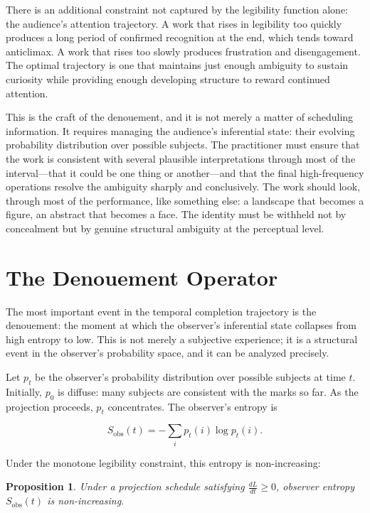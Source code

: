 \documentclass[11pt, twoside]{article}
\theoremstyle{plain}
\newtheorem{proposition}[theorem]{Proposition}
\theoremstyle{definition}
\theoremstyle{remark}
\begin{document}
There is an additional constraint not captured by the legibility function alone: the audience's attention trajectory. A work that rises in legibility too quickly produces a long period of confirmed recognition at the end, which tends toward anticlimax. A work that rises too slowly produces frustration and disengagement. The optimal trajectory is one that maintains just enough ambiguity to sustain curiosity while providing enough developing structure to reward continued attention.

This is the craft of the denouement, and it is not merely a matter of scheduling information. It requires managing the audience's inferential state: their evolving probability distribution over possible subjects. The practitioner must ensure that the work is consistent with several plausible interpretations through most of the interval---that it could be one thing or another---and that the final high-frequency operations resolve the ambiguity sharply and conclusively. The work should look, through most of the performance, like something else: a landscape that becomes a figure, an abstract that becomes a face. The identity must be withheld not by concealment but by genuine structural ambiguity at the perceptual level.

\section{The Denouement Operator}
\label{sec:denouement}

The most important event in the temporal completion trajectory is the denouement: the moment at which the observer's inferential state collapses from high entropy to low. This is not merely a subjective experience; it is a structural event in the observer's probability space, and it can be analyzed precisely.

Let $p_t$ be the observer's probability distribution over possible subjects at time $t$. Initially, $p_0$ is diffuse: many subjects are consistent with the marks so far. As the projection proceeds, $p_t$ concentrates. The observer's entropy is

\[
S_{\text{obs}}(t) = -\sum_i p_t(i) \log p_t(i).
\]

Under the monotone legibility constraint, this entropy is non-increasing:

\begin{proposition}
\label{prop:observer-entropy}
Under a projection schedule satisfying $\frac{dL}{dt} \geq 0$, observer entropy $S_{\text{obs}}(t)$ is non-increasing.
\end{proposition}
\end{document}
